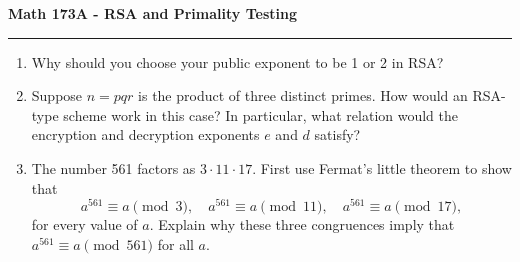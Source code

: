 \documentclass[11pt,letterpaper]{article}
\begin{document}
\begin{center}
{\bf \Large Math 173A - RSA and Primality Testing}
\vspace{0.2cm}
\hrule
\end{center}

\begin{enumerate}

    \item Why should you choose your public exponent to be 1 or 2 in RSA?

    \vfill

    \item Suppose $n = pqr$ is the product of three distinct primes.
    How would an RSA-type scheme work in this case?
    In particular, what relation would the encryption and decryption exponents $e$ and $d$ satisfy?

    \vfill

    \item The number 561 factors as $3\cdot 11\cdot 17$.
    First use Fermat's little theorem to show that
    \[
        a^{561}\equiv a\pmod 3,\quad a^{561}\equiv a\pmod {11},\quad a^{561}\equiv a\pmod {17},
    \]
    for every value of $a$.
    Explain why these three congruences imply that $a^{561}\equiv a\pmod{561}$ for all $a$.
    \vfill
\end{enumerate}
\end{document}
